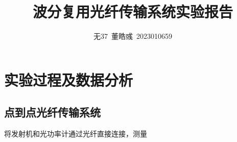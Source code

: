 \documentclass[utf8,twocolumn]{ctexart}
\title{波分复用光纤传输系统实验报告}
\author{无37~董皓彧~2023010659}
\date{\zhtoday}
\begin{document}
\maketitle
\thispagestyle{fancy}

\section{实验过程及数据分析}

\subsection{点到点光纤传输系统}
将发射机和光功率计通过光纤直接连接，测量
\end{document}
